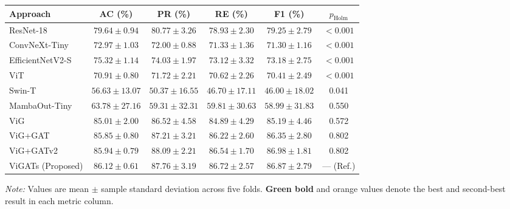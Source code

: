 \documentclass[]{interact}
\theoremstyle{plain}
\theoremstyle{definition}
\theoremstyle{remark}
\newcommand{\bestresult}[1]{\textcolor{bestgreen}{\textbf{#1}}}
\newcommand{\secondresult}[1]{\textcolor{secondorange}{#1}}
\begin{document}
\begin{table}[H]
\footnotesize
\setlength{\tabcolsep}{3.0pt}
{\begin{tabular}{lccccc} \toprule
\textbf{Approach} & \textbf{AC (\%)} & \textbf{PR (\%)} & \textbf{RE (\%)} & \textbf{F1 (\%)} & \textbf{$p_{\mathrm{Holm}}$} \\ \midrule
ResNet-18 \citep{he2016deep} & $79.64 \pm 0.94$ & $80.77 \pm 3.26$ & $78.93 \pm 2.30$ & $79.25 \pm 2.79$ & $< 0.001$ \\
ConvNeXt-Tiny \citep{liu2022convnext} & $72.97 \pm 1.03$ & $72.00 \pm 0.88$ & $71.33 \pm 1.36$ & $71.30 \pm 1.16$ & $< 0.001$ \\
EfficientNetV2-S \citep{tan2021efficientnetv2} & $75.32 \pm 1.14$ & $74.03 \pm 1.97$ & $73.12 \pm 3.32$ & $73.18 \pm 2.75$ & $< 0.001$ \\
ViT \citep{dosovitskiy2020image} & $70.91 \pm 0.80$ & $71.72 \pm 2.21$ & $70.62 \pm 2.26$ & $70.41 \pm 2.49$ & $< 0.001$ \\
Swin-T \citep{liu2021swin} & $56.63 \pm 13.07$ & $50.37 \pm 16.55$ & $46.70 \pm 17.11$ & $46.00 \pm 18.02$ & 0.041 \\
MambaOut-Tiny \citep{yu2024mambaout} & $63.78 \pm 27.16$ & $59.31 \pm 32.31$ & $59.81 \pm 30.63$ & $58.99 \pm 31.83$ & 0.550 \\
ViG \citep{han2022vision} & $85.01 \pm 2.00$ & $86.52 \pm 4.58$ & $84.89 \pm 4.29$ & $85.19 \pm 4.46$ & 0.572 \\
ViG+GAT \citep{velickovic2018graph} & $85.85 \pm 0.80$ & $87.21 \pm 3.21$ & $86.22 \pm 2.60$ & $86.35 \pm 2.80$ & 0.802 \\
ViG+GATv2 \citep{brody2022gat} & \secondresult{$85.94 \pm 0.79$} & \bestresult{$88.09 \pm 2.21$} & \secondresult{$86.54 \pm 1.70$} & \bestresult{$86.98 \pm 1.81$} & 0.802 \\
ViGATs (Proposed) & \bestresult{$86.12 \pm 0.61$} & \secondresult{$87.76 \pm 3.19$} & \bestresult{$86.72 \pm 2.57$} & \secondresult{$86.87 \pm 2.79$} & --- (Ref.) \\
\bottomrule
\end{tabular}}
\label{tab:plantraw}
\parbox{\textwidth}{\vspace{2pt}\footnotesize\textit{Note:} Values are mean $\pm$ sample standard deviation across five folds. \bestresult{Green bold} and \secondresult{orange} values denote the best and second-best result in each metric column.}
\end{table}
\end{document}
